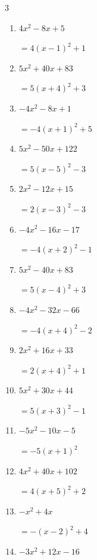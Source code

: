 \begin{multicols}{3}
\begin{enumerate}
        $=4\left( x-2\right)^{2}-2$

  \item $4x^{2}-8x+5$

        $=4\left( x-1\right)^{2}+1$

  \item $5x^{2}+40x+83$

        $=5\left( x+4\right)^{2}+3$

  \item $-4x^{2}-8x+1$

        $=-4\left( x+1\right)^{2}+5$

  \item $5x^{2}-50x+122$

        $=5\left( x-5\right)^{2}-3$

  \item $2x^{2}-12x+15$

        $=2\left( x-3\right)^{2}-3$

  \item $-4x^{2}-16x-17$

        $=-4\left( x+2\right)^{2}-1$

  \item $5x^{2}-40x+83$

        $=5\left( x-4\right)^{2}+3$

  \item $-4x^{2}-32x-66$

        $=-4\left( x+4\right)^{2}-2$

\columnbreak %

  \item $2x^{2}+16x+33$

        $=2\left( x+4\right)^{2}+1$

  \item $5x^{2}+30x+44$

        $=5\left( x+3\right)^{2}-1$

  \item $-5x^{2}-10x-5$

        $=-5\left( x+1\right)^{2}$

  \item $4x^{2}+40x+102$

        $=4\left( x+5\right)^{2}+2$

  \item $-x^{2}+4x$

        $=-\left( x-2\right)^{2}+4$

  \item $-3x^{2}+12x-16$


\end{enumerate}
\end{multicols}
